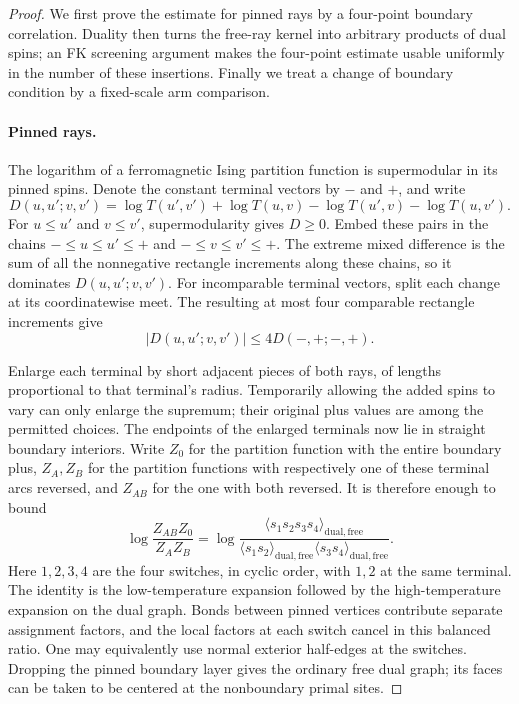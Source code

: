 \begin{proof}
We first prove the estimate for pinned rays by a four-point boundary
correlation. Duality then turns the free-ray kernel into arbitrary
products of dual spins; an FK screening argument makes the four-point
estimate usable uniformly in the number of these insertions. Finally
we treat a change of boundary condition by a fixed-scale arm comparison.

\paragraph{Pinned rays.}
The logarithm of a ferromagnetic Ising partition function is
supermodular in its pinned spins. Denote the constant terminal vectors
by $\boldsymbol{-}$ and $\boldsymbol{+}$, and write
\[
 D(u,u';v,v')=\log T(u',v')+\log T(u,v)
                   -\log T(u',v)-\log T(u,v').
\]
For $u\le u'$ and $v\le v'$, supermodularity gives $D\ge0$.
Embed these pairs in the chains
$\boldsymbol{-}\le u\le u'\le\boldsymbol{+}$ and
$\boldsymbol{-}\le v\le v'\le\boldsymbol{+}$.
The extreme mixed difference is the sum of all the nonnegative
rectangle increments along these chains, so it dominates
$D(u,u';v,v')$. For incomparable terminal vectors, split each change
at its coordinatewise meet. The resulting at most four comparable
rectangle increments give
\begin{equation}\label{eq:boundary-extreme-reduction}
 |D(u,u';v,v')|
 \le4D(\boldsymbol{-},\boldsymbol{+};
       \boldsymbol{-},\boldsymbol{+}).
\end{equation}

Enlarge each terminal by short adjacent pieces of both rays, of lengths
proportional to that terminal's radius. Temporarily allowing the added
spins to vary can only enlarge the supremum; their original plus values
are among the permitted choices. The endpoints of the enlarged
terminals now lie in straight boundary interiors. Write $Z_0$ for the
partition function with the entire boundary plus, $Z_A,Z_B$ for the
partition functions with respectively one of these terminal arcs
reversed, and $Z_{AB}$ for the one with both reversed. It is therefore
enough to bound
\begin{equation}
 \log\frac{Z_{AB}Z_0}{Z_AZ_B}
 =\log\frac{\langle s_1s_2s_3s_4\rangle_{\mathrm{dual,free}}}
                 {\langle s_1s_2\rangle_{\mathrm{dual,free}}
                  \langle s_3s_4\rangle_{\mathrm{dual,free}}}.
 \label{eq:fixed-boundary-duality}
\end{equation}
Here $1,2,3,4$ are the four switches, in cyclic order, with $1,2$
at the same terminal. The identity is the low-temperature expansion
followed by the high-temperature expansion on the dual graph. Bonds
between pinned vertices contribute separate assignment factors, and
the local factors at each switch cancel in this balanced ratio.
One may equivalently use normal exterior half-edges at the switches.
Dropping the pinned boundary layer gives the ordinary free dual graph;
its faces can be taken to be centered at the nonboundary primal sites.


\end{proof}
